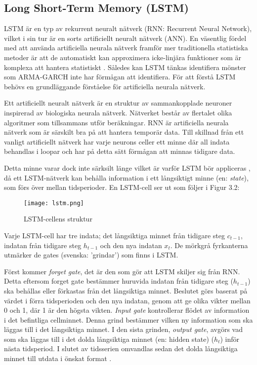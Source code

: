 \documentclass[11pt]{article}
\numberwithin{equation}{section}
\numberwithin{table}{section}
\numberwithin{figure}{section}
\begin{document}
\subsection{Long Short-Term Memory (LSTM)}
LSTM är en typ av rekurrent neuralt nätverk (RNN: Recurrent Neural Network), vilket i sin tur är en sorts artificiellt neuralt nätverk (ANN). En väsentlig fördel med att använda artificiella neurala nätverk framför mer traditionella statistiska metoder är att de automatiskt kan approximera icke-linjära funktioner som är komplexa att hantera statistiskt \parencite{paliwal2009neural}. Således kan LSTM tänkas identifiera mönster som ARMA-GARCH inte har förmågan att identifiera.  För att förstå LSTM behövs en grundläggande förståelse för artificiella neurala nätverk. 

Ett artificiellt neuralt nätverk är en struktur av sammankopplade neuroner inspirerad av biologiska neurala nätverk. Nätverket består av flertalet olika algoritmer som tillsammans utför beräkningar. RNN är artificiella neurala nätverk som är särskilt bra på att hantera temporär data. Till skillnad från ett vanligt artificiellt nätverk har varje neurons celler ett minne där all indata behandlas i loopar och har på detta sätt förmågan att minnas tidigare data. 

Detta minne varar dock inte särksilt länge vilket är varför LSTM bör appliceras \parencite[][,s.478-559]{purkait2019hands}, då ett LSTM-nätverk kan behålla information i ett långsiktigt minne (en: \textit{state}), som förs över mellan tidsperioder. En LSTM-cell ser ut som följer i Figur 3.2:

\begin{figure}[H]
\caption{LSTM-cellens struktur \parencite[lånad från][]{yuan2019nonlinear}}
\texttt{[image: lstm.png]}
\centering
\end{figure}

Varje LSTM-cell har tre indata; det långsiktiga minnet från tidigare steg \(c_{t-1}\), indatan från tidigare steg \(h_{t-1}\) och den nya indatan \(x_{t}\). De mörkgrå fyrkanterna utmärker de gates (svenska: 'grindar') som finns i LSTM. 

Först kommer \textit{forget gate}, det är den som gör att LSTM skiljer sig från RNN. Detta eftersom forget gate bestämmer huruvida indatan från tidigare steg (\(h_{t-1}\)) ska behållas eller förkastas från det långsiktiga minnet. Beslutet görs baserat på värdet i förra tidsperioden och den nya indatan, genom att ge olika vikter mellan 0 och 1, där 1 är den högsta vikten. \textit{Input gate} kontrollerar flödet av information i det befintliga cellminnet. Denna grind bestämmer vilken ny information som ska läggas till i det långsiktiga minnet. I den sista grinden, \textit{output gate}, avgörs vad som ska läggas till i det dolda långsiktiga minnet (en: hidden state) (\(h_{t}\)) inför nästa tidsperiod. I slutet av tidsserien omvandlas sedan det dolda långsiktiga minnet till utdata i önskat format \parencite[][,s.478-559]{purkait2019hands}.
\end{document}
